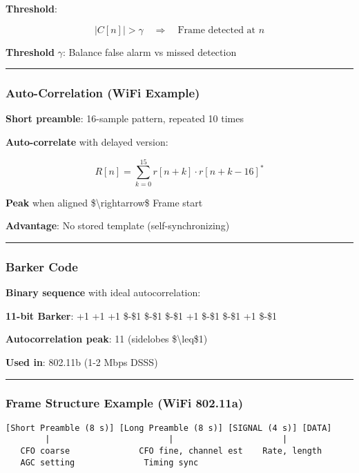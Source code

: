 \textbf{Threshold}:

\[
|C[n]| > \gamma \quad \Rightarrow \quad \text{Frame detected at } n
\]

\textbf{Threshold} \(\gamma\): Balance false alarm vs missed detection

\begin{center}\rule{0.5\linewidth}{0.5pt}\end{center}

\subsubsection{Auto-Correlation (WiFi
Example)}\label{auto-correlation-wifi-example}

\textbf{Short preamble}: 16-sample pattern, repeated 10 times

\textbf{Auto-correlate} with delayed version:

\[
R[n] = \sum_{k=0}^{15} r[n+k] \cdot r[n+k-16]^*
\]

\textbf{Peak} when aligned \$\textbackslash rightarrow\$ Frame start

\textbf{Advantage}: No stored template (self-synchronizing)

\begin{center}\rule{0.5\linewidth}{0.5pt}\end{center}

\subsubsection{Barker Code}\label{barker-code}

\textbf{Binary sequence} with ideal autocorrelation:

\textbf{11-bit Barker}: +1 +1 +1 \$-\$1 \$-\$1 \$-\$1 +1 \$-\$1 \$-\$1
+1 \$-\$1

\textbf{Autocorrelation peak}: 11 (sidelobes \$\textbackslash leq\$1)

\textbf{Used in}: 802.11b (1-2 Mbps DSSS)

\begin{center}\rule{0.5\linewidth}{0.5pt}\end{center}

\subsubsection{Frame Structure Example (WiFi
802.11a)}\label{frame-structure-example-wifi-802.11a}

\begin{verbatim}
[Short Preamble (8 s)] [Long Preamble (8 s)] [SIGNAL (4 s)] [DATA]
        |                        |                      |
   CFO coarse              CFO fine, channel est    Rate, length
   AGC setting              Timing sync
\end{verbatim}

